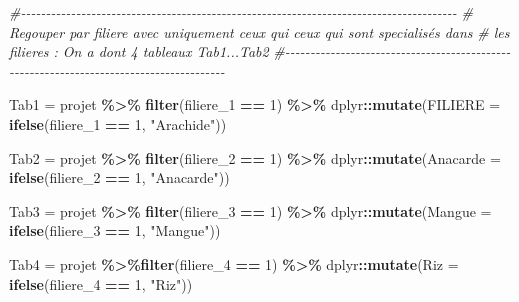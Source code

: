 \documentclass[
]{article}
\newenvironment{Shaded}{\begin{snugshade}}{\end{snugshade}}
\newcommand{\AttributeTok}[1]{\textcolor[rgb]{0.13,0.29,0.53}{#1}}
\newcommand{\CommentTok}[1]{\textcolor[rgb]{0.56,0.35,0.01}{\textit{#1}}}
\newcommand{\DecValTok}[1]{\textcolor[rgb]{0.00,0.00,0.81}{#1}}
\newcommand{\FunctionTok}[1]{\textcolor[rgb]{0.13,0.29,0.53}{\textbf{#1}}}
\newcommand{\NormalTok}[1]{#1}
\newcommand{\OtherTok}[1]{\textcolor[rgb]{0.56,0.35,0.01}{#1}}
\newcommand{\SpecialCharTok}[1]{\textcolor[rgb]{0.81,0.36,0.00}{\textbf{#1}}}
\newcommand{\StringTok}[1]{\textcolor[rgb]{0.31,0.60,0.02}{#1}}
\begin{document}
\begin{Shaded}
\begin{Highlighting}[]
\CommentTok{\#{-}{-}{-}{-}{-}{-}{-}{-}{-}{-}{-}{-}{-}{-}{-}{-}{-}{-}{-}{-}{-}{-}{-}{-}{-}{-}{-}{-}{-}{-}{-}{-}{-}{-}{-}{-}{-}{-}{-}{-}{-}{-}{-}{-}{-}{-}{-}{-}{-}{-}{-}{-}{-}{-}{-}{-}{-}{-}{-}{-}{-}{-}{-}{-}{-}{-}{-}{-}{-}{-}{-}{-}{-}{-}{-}{-}{-}{-}{-}{-}{-}{-}{-}{-}{-}{-}{-}}
\CommentTok{\#  Regouper par filiere avec uniquement ceux qui ceux qui sont specialisés dans  }
\CommentTok{\#   les filieres : On a dont 4 tableaux Tab1...Tab2}
\CommentTok{\#{-}{-}{-}{-}{-}{-}{-}{-}{-}{-}{-}{-}{-}{-}{-}{-}{-}{-}{-}{-}{-}{-}{-}{-}{-}{-}{-}{-}{-}{-}{-}{-}{-}{-}{-}{-}{-}{-}{-}{-}{-}{-}{-}{-}{-}{-}{-}{-}{-}{-}{-}{-}{-}{-}{-}{-}{-}{-}{-}{-}{-}{-}{-}{-}{-}{-}{-}{-}{-}{-}{-}{-}{-}{-}{-}{-}{-}{-}{-}{-}{-}{-}{-}{-}{-}{-}{-}{-}}

\NormalTok{Tab1 }\OtherTok{=}\NormalTok{ projet }\SpecialCharTok{\%\textgreater{}\%}
\FunctionTok{filter}\NormalTok{(filiere\_1 }\SpecialCharTok{==} \DecValTok{1}\NormalTok{) }\SpecialCharTok{\%\textgreater{}\%}
\NormalTok{dplyr}\SpecialCharTok{::}\FunctionTok{mutate}\NormalTok{(}\AttributeTok{FILIERE =} \FunctionTok{ifelse}\NormalTok{(filiere\_1 }\SpecialCharTok{==} \DecValTok{1}\NormalTok{, }\StringTok{"Arachide"}\NormalTok{))}


\NormalTok{Tab2 }\OtherTok{=}\NormalTok{ projet }\SpecialCharTok{\%\textgreater{}\%}
  \FunctionTok{filter}\NormalTok{(filiere\_2 }\SpecialCharTok{==} \DecValTok{1}\NormalTok{) }\SpecialCharTok{\%\textgreater{}\%}
\NormalTok{  dplyr}\SpecialCharTok{::}\FunctionTok{mutate}\NormalTok{(}\AttributeTok{Anacarde =} \FunctionTok{ifelse}\NormalTok{(filiere\_2 }\SpecialCharTok{==} \DecValTok{1}\NormalTok{, }\StringTok{"Anacarde"}\NormalTok{))}


\NormalTok{Tab3 }\OtherTok{=}\NormalTok{ projet }\SpecialCharTok{\%\textgreater{}\%}
  \FunctionTok{filter}\NormalTok{(filiere\_3 }\SpecialCharTok{==} \DecValTok{1}\NormalTok{) }\SpecialCharTok{\%\textgreater{}\%}
\NormalTok{  dplyr}\SpecialCharTok{::}\FunctionTok{mutate}\NormalTok{(}\AttributeTok{Mangue =} \FunctionTok{ifelse}\NormalTok{(filiere\_3 }\SpecialCharTok{==} \DecValTok{1}\NormalTok{, }\StringTok{"Mangue"}\NormalTok{))}


\NormalTok{Tab4 }\OtherTok{=}\NormalTok{ projet }\SpecialCharTok{\%\textgreater{}\%}\FunctionTok{filter}\NormalTok{(filiere\_4 }\SpecialCharTok{==} \DecValTok{1}\NormalTok{) }\SpecialCharTok{\%\textgreater{}\%}
\NormalTok{  dplyr}\SpecialCharTok{::}\FunctionTok{mutate}\NormalTok{(}\AttributeTok{Riz =} \FunctionTok{ifelse}\NormalTok{(filiere\_4 }\SpecialCharTok{==} \DecValTok{1}\NormalTok{, }\StringTok{"Riz"}\NormalTok{))}



\end{Highlighting}
\end{Shaded}
\end{document}
